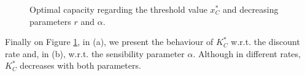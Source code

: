 

\begin{figure}[!htb]
	\begin{subfigmatrix}{2}
	\end{subfigmatrix}
	\caption{Optimal capacity regarding the threshold value $x^*_C$ and decreasing parameters $r$ and $\alpha$.}
	\label{fig:k2}
\end{figure}

Finally on Figure \ref{fig:k2}, in (a), we present the behaviour of $K^*_C$ w.r.t. the discount rate and, in (b), w.r.t. the sensibility parameter $\alpha$. Although in different rates, $K_C^*$ decreases with both parameters.
 

